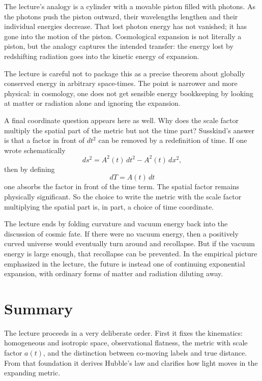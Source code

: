The lecture's analogy is a cylinder with a movable piston filled with photons. As the photons push the piston outward, their wavelengths lengthen and their individual energies decrease. That lost photon energy has not vanished; it has gone into the motion of the piston. Cosmological expansion is not literally a piston, but the analogy captures the intended transfer: the energy lost by redshifting radiation goes into the kinetic energy of expansion.

The lecture is careful not to package this as a precise theorem about globally conserved energy in arbitrary space-times. The point is narrower and more physical: in cosmology, one does not get sensible energy bookkeeping by looking at matter or radiation alone and ignoring the expansion.

A final coordinate question appears here as well. Why does the scale factor multiply the spatial part of the metric but not the time part? Susskind's answer is that a factor in front of \(dt^2\) can be removed by a redefinition of time. If one wrote schematically
\begin{equation}
ds^2=A^2(t)\,dt^2-A^2(t)\,dx^2,
\end{equation}
then by defining
\begin{equation}
dT=A(t)\,dt
\end{equation}
one absorbs the factor in front of the time term. The spatial factor remains physically significant. So the choice to write the metric with the scale factor multiplying the spatial part is, in part, a choice of time coordinate.

The lecture ends by folding curvature and vacuum energy back into the discussion of cosmic fate. If there were no vacuum energy, then a positively curved universe would eventually turn around and recollapse. But if the vacuum energy is large enough, that recollapse can be prevented. In the empirical picture emphasized in the lecture, the future is instead one of continuing exponential expansion, with ordinary forms of matter and radiation diluting away.

\section{Summary}

The lecture proceeds in a very deliberate order. First it fixes the kinematics: homogeneous and isotropic space, observational flatness, the metric with scale factor \(a(t)\), and the distinction between co-moving labels and true distance. From that foundation it derives Hubble's law and clarifies how light moves in the expanding metric.

